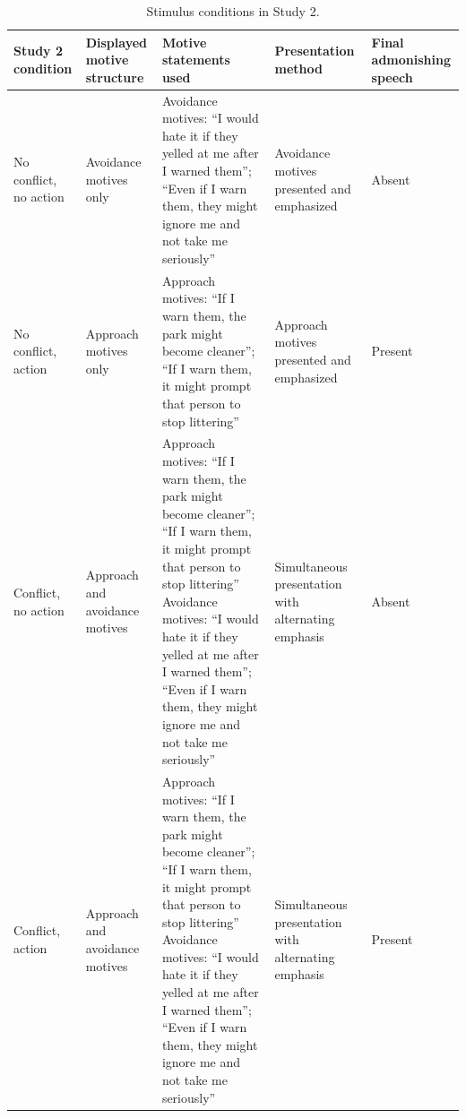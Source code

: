 \documentclass[utf8]{FrontiersinHarvard}
\begin{document}
\begin{table}[htbp]
\centering
\footnotesize
\caption{Stimulus conditions in Study 2.}
\label{tab:study2_conditions}
\begin{tabularx}{\linewidth}{>{\hsize}Y >{\hsize}Y >{\hsize}Y >{\hsize}Y >{\hsize}Y}
\toprule
\textbf{Study 2 condition} & \textbf{Displayed motive structure} & \textbf{Motive statements used} & \textbf{Presentation method} & \textbf{Final admonishing speech} \\
\midrule
No conflict, no action & Avoidance motives only & Avoidance motives: ``I would hate it if they yelled at me after I warned them''; ``Even if I warn them, they might ignore me and not take me seriously'' & Avoidance motives presented and emphasized & Absent \\
\midrule
No conflict, action & Approach motives only & Approach motives: ``If I warn them, the park might become cleaner''; ``If I warn them, it might prompt that person to stop littering'' & Approach motives presented and emphasized & Present \\
\midrule
Conflict, no action & Approach and avoidance motives & Approach motives: ``If I warn them, the park might become cleaner''; ``If I warn them, it might prompt that person to stop littering'' \newline Avoidance motives: ``I would hate it if they yelled at me after I warned them''; ``Even if I warn them, they might ignore me and not take me seriously'' & Simultaneous presentation with alternating emphasis & Absent \\
\midrule
Conflict, action & Approach and avoidance motives & Approach motives: ``If I warn them, the park might become cleaner''; ``If I warn them, it might prompt that person to stop littering'' \newline Avoidance motives: ``I would hate it if they yelled at me after I warned them''; ``Even if I warn them, they might ignore me and not take me seriously'' & Simultaneous presentation with alternating emphasis & Present \\
\bottomrule
\end{tabularx}
\end{table}
\end{document}
